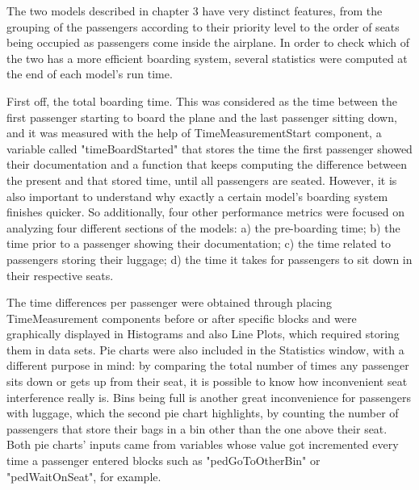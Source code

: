 The two models described in chapter 3 have very distinct features, from the grouping of the passengers according to their priority level to the order of seats being occupied as passengers come inside the airplane. In order to check which of the two has a more efficient boarding system, several statistics were computed at the end of each model's run time.

\indent\newline
First off, the total boarding time. This was considered as the time between the first passenger starting to board the plane and the last passenger sitting down, and it was measured with the help of TimeMeasurementStart component, a variable called "timeBoardStarted" that stores the time the first passenger showed their documentation and a function that keeps computing the difference between the present and that stored time, until all passengers are seated.
However, it is also important to understand why exactly a certain model’s boarding system finishes quicker. So additionally, four other performance metrics were focused on analyzing four different sections of the models: a) the pre-boarding time; b) the time prior to a passenger showing their documentation; c) the time related to passengers storing their luggage; d) the time it takes for passengers to sit down in their respective seats. 

\indent\newline
The time differences per passenger were obtained through placing TimeMeasurement components before or after specific blocks and were graphically displayed in Histograms and also Line Plots, which required storing them in data sets. Pie charts were also included in the Statistics window, with a different purpose in mind: by comparing the total number of times any passenger sits down or gets up from their seat, it is possible to know how inconvenient seat interference really is. Bins being full is another great inconvenience for passengers with luggage, which the second pie chart highlights, by counting the number of passengers that store their bags in a bin other than the one above their seat. Both pie charts’ inputs came from variables whose value got incremented every time a passenger entered blocks such as "pedGoToOtherBin" or "pedWaitOnSeat", for example.
